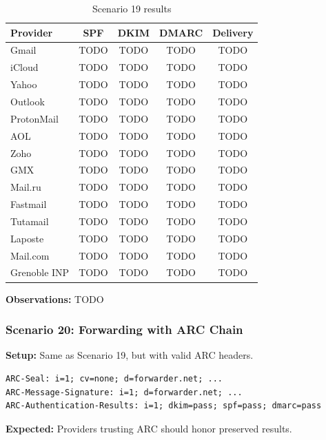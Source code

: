 \documentclass[11pt,a4paper]{article}
\begin{document}
\begin{table}[h]
\centering
\small
\begin{tabular}{lcccc}
\toprule
\textbf{Provider} & \textbf{SPF} & \textbf{DKIM} & \textbf{DMARC} & \textbf{Delivery} \\
\midrule
Gmail & TODO & TODO & TODO & TODO \\
iCloud & TODO & TODO & TODO & TODO \\
Yahoo & TODO & TODO & TODO & TODO \\
Outlook & TODO & TODO & TODO & TODO \\
ProtonMail & TODO & TODO & TODO & TODO \\
AOL & TODO & TODO & TODO & TODO \\
Zoho & TODO & TODO & TODO & TODO \\
GMX & TODO & TODO & TODO & TODO \\
Mail.ru & TODO & TODO & TODO & TODO \\
Fastmail & TODO & TODO & TODO & TODO \\
Tutamail & TODO & TODO & TODO & TODO \\
Laposte & TODO & TODO & TODO & TODO \\
Mail.com & TODO & TODO & TODO & TODO \\
Grenoble INP & TODO & TODO & TODO & TODO \\
\bottomrule
\end{tabular}
\caption{Scenario 19 results}
\end{table}

\textbf{Observations:} TODO


\subsubsection{Scenario 20: Forwarding with ARC Chain}

\textbf{Setup:} Same as Scenario 19, but with valid ARC headers.

\begin{lstlisting}
ARC-Seal: i=1; cv=none; d=forwarder.net; ...
ARC-Message-Signature: i=1; d=forwarder.net; ...
ARC-Authentication-Results: i=1; dkim=pass; spf=pass; dmarc=pass
\end{lstlisting}

\textbf{Expected:} Providers trusting ARC should honor preserved results.
\end{document}
